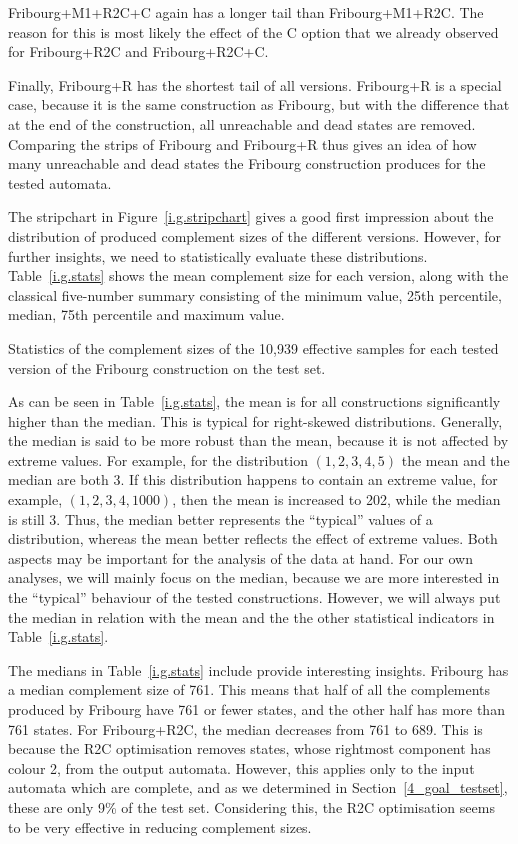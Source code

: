 Fribourg+M1+R2C+C again has a longer tail than Fribourg+M1+R2C. The reason for this is most likely the effect of the C option that we already observed for Fribourg+R2C and Fribourg+R2C+C.

Finally, Fribourg+R has the shortest tail of all versions. Fribourg+R is a special case, because it is the same construction as Fribourg, but with the difference that at the end of the construction, all unreachable and dead states are removed. Comparing the strips of Fribourg and Fribourg+R thus gives an idea of how many unreachable and dead states the Fribourg construction produces for the tested automata.

The stripchart in Figure~\ref{i.g.stripchart} gives a good first impression about the distribution of produced complement sizes of the different versions. However, for further insights, we need to statistically evaluate these distributions. Table~\ref{i.g.stats} shows the mean complement size for each version, along with the classical five-number summary consisting of the minimum value, 25th percentile, median, 75th percentile and maximum value.

\begin{table}[ht]
\centering

\caption{Statistics of the complement sizes of the 10,939 effective samples for each tested version of the Fribourg construction on the \goal{} test set.}
\label{i.g.stats}
\end{table}

As can be seen in Table~\ref{i.g.stats}, the mean is for all constructions significantly higher than the median. This is typical for right-skewed distributions. Generally, the median is said to be more robust than the mean, because it is not affected by extreme values. For example, for the distribution $(1,2,3,4,5)$ the mean and the median are both 3. If this distribution happens to contain an extreme value, for example, $(1,2,3,4,1000)$, then the mean is increased to 202, while the median is still 3. Thus, the median better represents the ``typical'' values of a distribution, whereas the mean better reflects the effect of extreme values. Both aspects may be important for the analysis of the data at hand. For our own analyses, we will mainly focus on the median, because we are more interested in the ``typical'' behaviour of the tested constructions. However, we will always put the median in relation with the mean and the the other statistical indicators in Table~\ref{i.g.stats}.

The medians in Table~\ref{i.g.stats} include provide interesting insights. Fribourg has a median complement size of 761. This means that half of all the complements produced by Fribourg have 761 or fewer states, and the other half has more than 761 states. For Fribourg+R2C, the median decreases from 761 to 689. This is because the R2C optimisation removes states, whose rightmost component has colour 2, from the output automata. However, this applies only to the input automata which are complete, and as we determined in Section~\ref{4_goal_testset}, these are only 9\% of the \goal{} test set. Considering this, the R2C optimisation seems to be very effective in reducing complement sizes.

